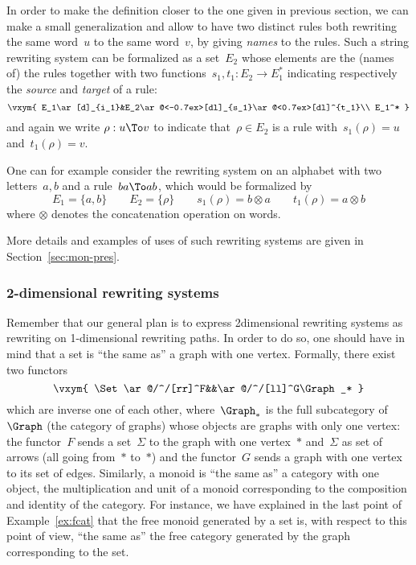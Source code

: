 \documentclass{LMCS}
\begin{document}
In order to make the definition closer to the one given in previous section, we
can make a small generalization and allow to have two distinct rules both
rewriting the same word~$u$ to the same word~$v$, by giving \emph{names} to the
rules. Such a string rewriting system can be formalized as a set~$E_2$ whose
elements are the (names of) the rules together with two
functions~$s_1,t_1:E_2\to E_1^*$ indicating respectively the \emph{source} and
\emph{target} of a rule:
\[
\vxym{
  E_1\ar[d]_{i_1}&E_2\ar@<-0.7ex>[dl]_{s_1}\ar@<0.7ex>[dl]^{t_1}\\
  E_1^*
}
\]
and again we write $\rho:u\To v$ to indicate that~$\rho\in E_2$ is a rule
with~$s_1(\rho)=u$ and~$t_1(\rho)=v$.

\begin{exa}
  \label{ex:str-rs}
  One can for example consider the rewriting system on an alphabet with two
  letters~$a,b$ and a rule~$ba\To ab$, which would be formalized by
  \[
  E_1=\{a,b\}
  \qquad
  E_2=\{\rho\}
  \qquad
  s_1(\rho)=b\otimes a
  \qquad
  t_1(\rho)=a\otimes b
  \]
  where $\otimes$ denotes the concatenation operation on words.
\end{exa}

\noindent
More details and examples of uses of such rewriting systems are given in
Section~\ref{sec:mon-pres}.

\subsubsection{2-dimensional rewriting systems}
\label{sec:2-rs}
Remember that our general plan is to express 2\nbd{}dimensional rewriting
systems as rewriting on 1-dimensional rewriting paths. In order to do so, one
should have in mind that a set is ``the same as'' a graph with one
vertex. Formally, there exist two functors
\[
\vxym{
  \Set\ar@/^/[rr]^F&&\ar@/^/[ll]^G\Graph_*
}
\]
which are inverse one of each other, where~$\Graph_*$ is the full subcategory
of~$\Graph$ (the category of graphs) whose objects are graphs with only one
vertex: the functor~$F$ sends a set~$\Sigma$ to the graph with one vertex~$\ast$
and~$\Sigma$ as set of arrows (all going from~$\ast$ to~$\ast$) and the
functor~$G$ sends a graph with one vertex to its set of edges. Similarly, a
monoid is ``the same as'' a category with one object, the multiplication and
unit of a monoid corresponding to the composition and identity of the
category. For instance, we have explained in the last point of
Example~\ref{ex:fcat} that the free monoid generated by a set is, with respect
to this point of view, ``the same as'' the free category generated by the graph
corresponding to the set.
\end{document}
